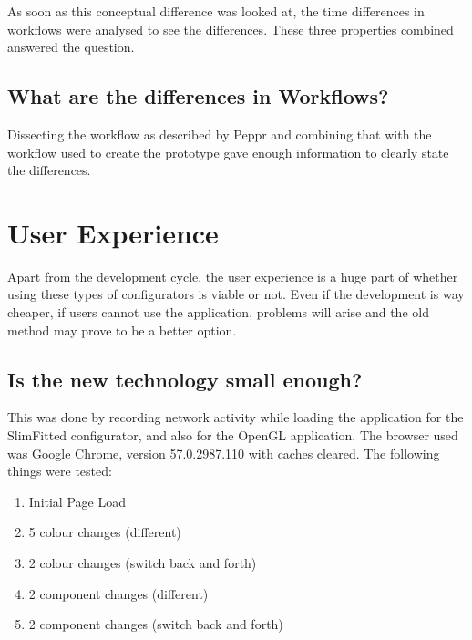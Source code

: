 As soon as this conceptual difference was looked at, the time differences in workflows were analysed to see the differences. \newline
These three properties combined answered the question.

\subsection{What are the differences in Workflows?}
Dissecting the workflow as described by Peppr and combining that with the workflow used to create the prototype gave enough information to clearly state the differences.

\section{User Experience}
Apart from the development cycle, the user experience is a huge part of whether using these types of configurators is viable or not. Even if the development is way cheaper, if users cannot use the application, problems will arise and the old method may prove to be a better option.

\subsection{Is the new technology small enough?}
This was done by recording network activity while loading the application for the SlimFitted configurator, and also for the OpenGL application. The browser used was Google Chrome, version 57.0.2987.110 with caches cleared. The following things were tested:
\label{subsub:techSmall}
​\begin{enumerate}
\item {Initial Page Load}
\item{5 colour changes (different)}
\item {2 colour changes (switch back and forth)}
\item {2 component changes (different)}
\item {2 component changes (switch back and forth)}
\end{enumerate}

